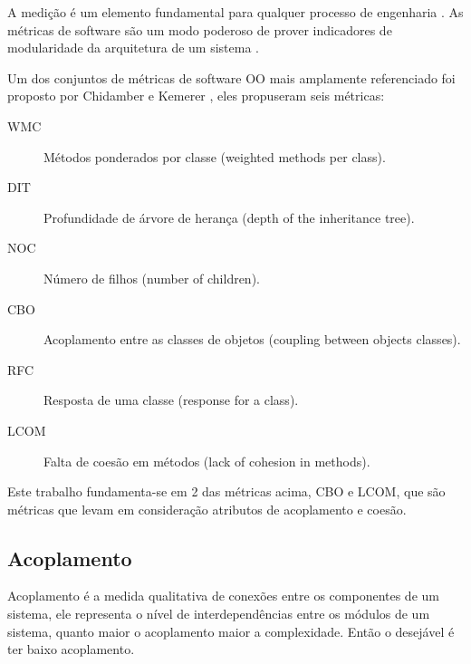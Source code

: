 A medição é um elemento fundamental para qualquer processo de engenharia
\cite{engenhariaDeSoftwarePressman}. As métricas de software são um modo
poderoso de prover indicadores de modularidade da arquitetura de um sistema
\cite{OntheModular}.

Um dos conjuntos de métricas de software OO
mais amplamente referenciado foi proposto por Chidamber e Kemerer
\cite{engenhariaDeSoftwarePressman}, eles propuseram seis métricas:

\begin{description}

\item[WMC]
Métodos ponderados por classe (weighted methods per class).

\item[DIT]
Profundidade de árvore de herança (depth of the inheritance tree).

\item[NOC]
Número de filhos (number of children).

\item[CBO]
Acoplamento entre as classes de objetos (coupling between objects classes).

\item[RFC]
Resposta de uma classe (response for a class).

\item[LCOM]
Falta de coesão em métodos (lack of cohesion in methods).

\end{description}

Este trabalho fundamenta-se em 2 das métricas acima, CBO e LCOM, que são
métricas que levam em consideração atributos de acoplamento e coesão.

\subsection{Acoplamento}

Acoplamento é a medida qualitativa de conexões entre os componentes de um
sistema, ele representa o nível de interdependências entre os módulos de um
sistema, quanto maior o acoplamento maior a complexidade. Então o desejável é
ter baixo acoplamento.


